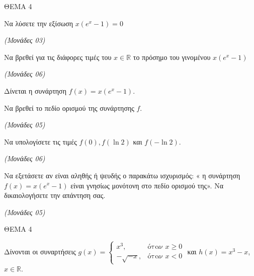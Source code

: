 \documentclass[11pt,a4paper,twoside]{book}
\newcommand{\monades}[1]{\hfill \textit{(Μονάδες #1)}}
\begin{document}
\vspace{4mm}

ΘΕΜΑ 4

\begin{alist}
\item

\end{alist}
\begin{alist}
\item
  Να λύσετε την εξίσωση $x(e^x - 1) = 0$

\monades{03}


\end{alist}
\begin{alist}
\item
  Να βρεθεί για τις διάφορες τιμές του $x \in \mathbb{R}$ το πρόσημο του γινομένου $x(e^x - 1)$

\monades{06}

\item Δίνεται η συνάρτηση $f(x) = x(e^x - 1)$.

\end{alist}
\begin{alist}
\item
  Να βρεθεί το πεδίο ορισμού της συνάρτησης $f$.

\monades{05}


\end{alist}
\begin{alist}
\item
  Να υπολογίσετε τις τιμές $f(0), f(\ln 2)$ και $f(-\ln 2)$.

\monades{06}


\end{alist}
\begin{alist}
\item
  Να εξετάσετε αν είναι αληθής ή ψευδής ο παρακάτω ισχυρισμός: « η συνάρτηση $f(x) = x(e^x - 1)$ είναι γνησίως μονότονη στο πεδίο ορισμού της». Να δικαιολογήσετε την απάντηση σας.

\monades{05}
\end{alist}

\vspace{4mm}

ΘΕΜΑ 4

Δίνονται οι συναρτήσεις $g(x) = \begin{cases} x^3, & \text{όταν } x \geq 0 \\ -\sqrt{-x}, & \text{όταν } x < 0 \end{cases}$ και $h(x) = x^3 - x$, $x \in \mathbb{R}$.
\end{document}
